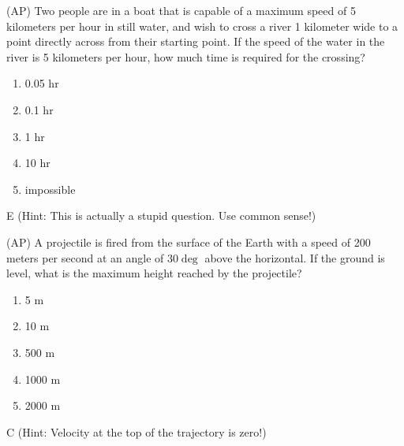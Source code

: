 \begin{question}
(AP) Two people are in a boat that is capable of a maximum speed of 5 kilometers per hour in still water, and wish to cross a river 1 kilometer wide to a point directly across from their starting point. If the speed of the water in the river is 5 kilometers per hour, how much time is required for the crossing?
\begin{multicols}{5}
\begin{enumerate}[label=(\alph*)]
    \item 0.05 hr
    \item 0.1 hr
    \item 1 hr
    \item 10 hr
    \item \small{impossible}
\end{enumerate}
\end{multicols}
\end{question}

\begin{solution}
E (Hint: This is actually a stupid question. Use common sense!)
\end{solution}


\begin{question}
(AP) A projectile is fired from the surface of the Earth with a speed of 200 meters per second at an angle of $30\deg$ above the horizontal. If the ground is level, what is the maximum height reached by the projectile?
\begin{multicols}{5}
\begin{enumerate}[label=(\alph*)]
    \item 5 m
    \item 10 m
    \item 500 m
    \item 1000 m
    \item 2000 m
\end{enumerate}
\end{multicols}
\end{question}

\begin{solution}
C (Hint: Velocity at the top of the trajectory is zero!)
\end{solution}


